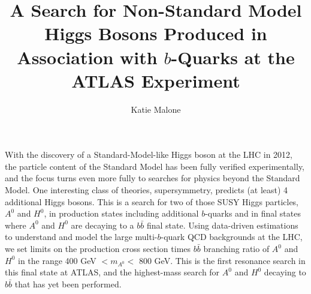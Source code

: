 \documentclass[12pt]{report}
\begin{document}
	\title{A Search for Non-Standard Model Higgs Bosons Produced in Association with $b$-Quarks at the ATLAS Experiment}
	\author{Katie Malone}

\beforepreface
{}
With the discovery of a Standard-Model-like Higgs boson at the LHC 
in 2012, the particle content of the Standard Model has been fully verified experimentally,
and the focus turns even more fully to searches for physics beyond the Standard Model.  
One interesting class of theories, supersymmetry, predicts (at least) 4 additional 
Higgs bosons.  This is a search for two of those SUSY Higgs particles, 
$A^0$ and $H^0$, in production states including additional $b$-quarks and in final 
states where $A^0$ and $H^0$ are decaying to a $b\bar{b}$ final state.  
Using data-driven estimations to understand and model the large multi-$b$-quark 
QCD backgrounds at the LHC, we set limits on the production cross section times 
$b\bar{b}$ branching ratio of $A^0$ and $H^0$ in the range 400 GeV $<m_{A^0}<$ 800 GeV.  
This is the first resonance search in this final state at ATLAS, and the 
highest-mass search for $A^0$ and $H^0$ decaying to $b\bar{b}$ that has yet been performed.
\afterpreface


























\end{document}
